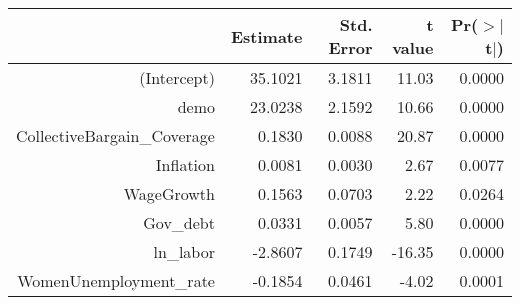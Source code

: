 \begin{table}[ht]
\centering
\begin{tabular}{rrrrr}
  \hline
 & Estimate & Std. Error & t value & Pr($>$$|$t$|$) \\ 
  \hline
(Intercept) & 35.1021 & 3.1811 & 11.03 & 0.0000 \\ 
  demo & 23.0238 & 2.1592 & 10.66 & 0.0000 \\ 
  CollectiveBargain\_Coverage & 0.1830 & 0.0088 & 20.87 & 0.0000 \\ 
  Inflation & 0.0081 & 0.0030 & 2.67 & 0.0077 \\ 
  WageGrowth & 0.1563 & 0.0703 & 2.22 & 0.0264 \\ 
  Gov\_debt & 0.0331 & 0.0057 & 5.80 & 0.0000 \\ 
  ln\_labor & -2.8607 & 0.1749 & -16.35 & 0.0000 \\ 
  WomenUnemployment\_rate & -0.1854 & 0.0461 & -4.02 & 0.0001 \\ 
   \hline
\end{tabular}
\end{table}
